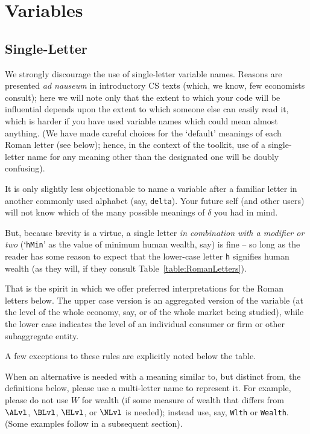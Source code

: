 \documentclass{econark}
\begin{document}
\pagebreak

\section{Variables}

\subsection{Single-Letter}

We strongly discourage the use of single-letter variable names.  Reasons are presented \textit{ad nauseum} in introductory CS texts (which, we know, few economists consult); here we will note only that the extent to which your code will be influential depends upon the extent to which someone else can easily read it, which is harder if you have used variable names which could mean almost anything.  (We have made careful choices for the `default' meanings of each Roman letter (see below); hence, in the context of the toolkit, use of a single-letter name for any meaning other than the designated one will be doubly confusing).

It is only slightly less objectionable to name a variable after a familiar letter in another commonly used alphabet (say, \texttt{delta}).  Your future self (and other users) will not know which of the many possible meanings of $\delta$ you had in mind.

But, because brevity is a virtue, a single letter \textit{in combination with a modifier or two} (`\texttt{hMin}' as the value of minimum human wealth, say) is fine -- so long as the reader has some reason to expect that the lower-case letter \texttt{h} signifies human wealth (as they will, if they consult Table~\ref{table:RomanLetters}).

That is the spirit in which we offer preferred interpretations for the Roman letters below.  The upper case version is an aggregated version of the variable (at the level of the whole economy, say, or of the whole market being studied), while the lower case indicates the level of an individual consumer or firm or other subaggregate entity.

A few exceptions to these rules are explicitly noted below the table.

When an alternative is needed with a meaning similar to, but distinct from, the definitions below, please use a multi-letter name to represent it.  For example, please do not use $W$ for wealth (if some measure of wealth that differs from $\ALvl$, $\BLvl$, $\HLvl$, or $\NLvl$ is needed); instead use, say, \texttt{Wlth} or \texttt{Wealth}.  (Some examples follow in a subsequent section).
\end{document}
